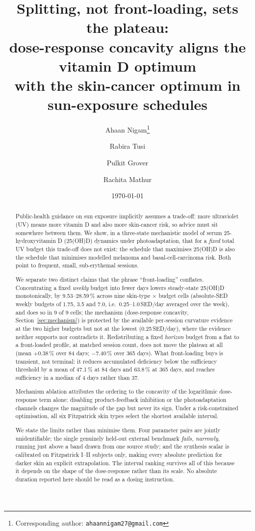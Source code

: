 \documentclass[11pt]{article}
\title{\bfseries Splitting, not front-loading, sets the plateau:\\
dose-response concavity aligns the vitamin D optimum\\
with the skin-cancer optimum in sun-exposure schedules}
\author[1]{Ahaan Nigam\thanks{Corresponding author: \texttt{ahaannigam27@gmail.com}}}
\author[2]{Rabira Tusi}
\author[2]{Pulkit Grover}
\author[3]{Rachita Mathur}
\affil[1]{\small Independent researcher}
\affil[2]{\small Carnegie Mellon University, Pittsburgh, PA, USA}
\affil[3]{\small Jaipur, Rajasthan, India}
\date{\today}
\begin{document}
\maketitle

\begin{abstract}
\noindent
Public-health guidance on sun exposure implicitly assumes a trade-off:
more ultraviolet (UV) means more vitamin D and also more skin-cancer
risk, so advice must sit somewhere between them. We show, in a
three-state mechanistic model of serum 25-hydroxyvitamin D
(25(OH)D) dynamics under photoadaptation, that for a \emph{fixed}
total UV budget this trade-off does not exist: the schedule that
maximises 25(OH)D is also the schedule that minimises modelled
melanoma and basal-cell-carcinoma risk. Both point to frequent, small,
sub-erythemal sessions.

We separate two distinct claims that the phrase ``front-loading''
conflates. Concentrating a fixed \emph{weekly} budget into fewer days
lowers steady-state 25(OH)D monotonically, by 9.53--28.59\,\% across
nine skin-type $\times$ budget cells (absolute-SED weekly budgets of
1.75, 3.5 and 7.0, i.e.\ 0.25--1.0\,SED/day averaged over the week),
and does so in 9 of 9 cells; the mechanism (dose-response concavity,
Section~\ref{sec:mechanism}) is protected by the available per-session
curvature evidence at the two higher budgets but not at the lowest
(0.25\,SED/day), where the evidence neither supports nor contradicts
it. Redistributing a fixed \emph{horizon} budget from a flat to a
front-loaded profile, at matched session count, does not move the
plateau at all (mean $+0.38\,\%$ over 84 days; $-7.40\,\%$ over 365
days). What front-loading buys is transient, not terminal: it reduces
accumulated deficiency below the sufficiency threshold by a mean of
47.1\,\% at 84 days and 63.8\,\% at 365 days, and reaches sufficiency
in a median of 4 days rather than 37.

Mechanism ablation attributes the ordering to the concavity of the
logarithmic dose-response term alone; disabling product-feedback
inhibition or the photoadaptation channels changes the magnitude of
the gap but never its sign. Under a risk-constrained optimisation, all
six Fitzpatrick skin types select the shortest available interval.

We state the limits rather than minimise them. Four parameter pairs
are jointly unidentifiable; the single genuinely held-out external
benchmark \emph{fails, narrowly}, running just above a band drawn
from one source study; and the synthesis scalar is calibrated on
Fitzpatrick I--II subjects only, making every absolute prediction for
darker skin an explicit extrapolation. The interval ranking survives
all of this because it depends on the shape of the dose-response
rather than its scale. No absolute duration reported here should be
read as a dosing instruction.
\end{abstract}
\end{document}
